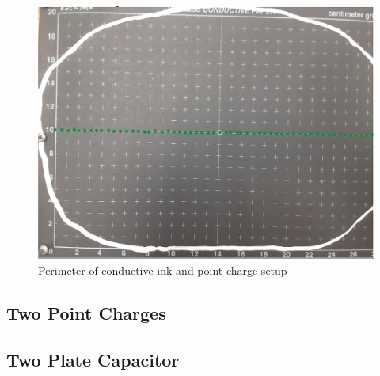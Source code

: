 \documentclass[titlepage]{article}
\begin{document}
    \FloatBarrier
    \begin{figure}[hbt!]
        \centering
        \caption{Perimeter of conductive ink and point charge setup}
        \includegraphics[scale=0.8]{procedure/part1}

    \end{figure} 
    \FloatBarrier


    

    \subsection{Two Point Charges}




    \subsection{Two Plate Capacitor}
\end{document}
